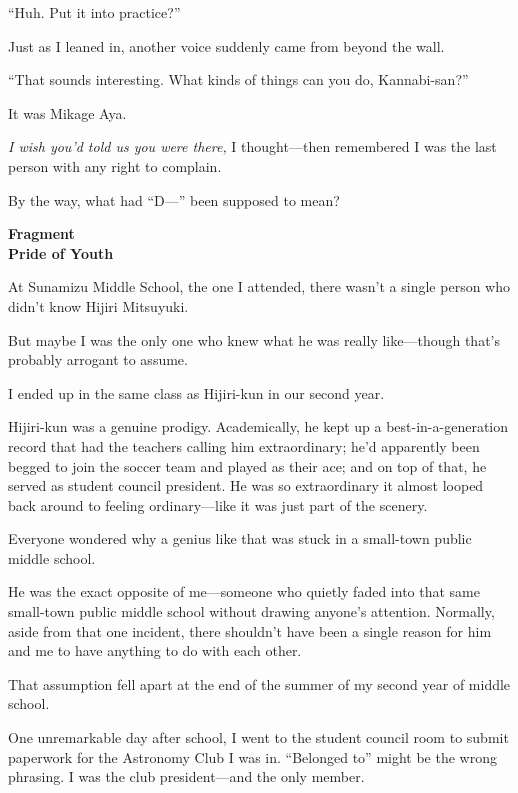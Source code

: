 \documentclass[
    a4paper,
    12pt,
    twoside,
    openany,
    UTF8,
    fontset=windows
]{ctexbook}
\begin{document}
``Huh. Put it into practice?''

Just as I leaned in, another voice suddenly came from beyond the wall.

``That sounds interesting. What kinds of things can you do, Kannabi-san?''

It was Mikage Aya.

\textit{I wish you'd told us you were there,} I thought---then remembered I was the last person with any right to complain.

By the way, what had ``D---'' been supposed to mean?


\clearpage
\thispagestyle{plain}
\begin{center}
    \large\bfseries
    Fragment\\
    Pride of Youth
\end{center}
\label{sec:fragPride}
\vspace{1cm}

At Sunamizu Middle School, the one I attended, there wasn't a single person who didn't know Hijiri Mitsuyuki.

But maybe I was the only one who knew what he was really like---though that's probably arrogant to assume.

I ended up in the same class as Hijiri-kun in our second year.

Hijiri-kun was a genuine prodigy. Academically, he kept up a best-in-a-generation record that had the teachers calling him extraordinary; he'd apparently been begged to join the soccer team and played as their ace; and on top of that, he served as student council president. He was so extraordinary it almost looped back around to feeling ordinary---like it was just part of the scenery.

Everyone wondered why a genius like that was stuck in a small-town public middle school.

He was the exact opposite of me---someone who quietly faded into that same small-town public middle school without drawing anyone's attention. Normally, aside from that one incident, there shouldn't have been a single reason for him and me to have anything to do with each other.

That assumption fell apart at the end of the summer of my second year of middle school.

One unremarkable day after school, I went to the student council room to submit paperwork for the Astronomy Club I was in. ``Belonged to'' might be the wrong phrasing. I was the club president---and the only member.
\end{document}
